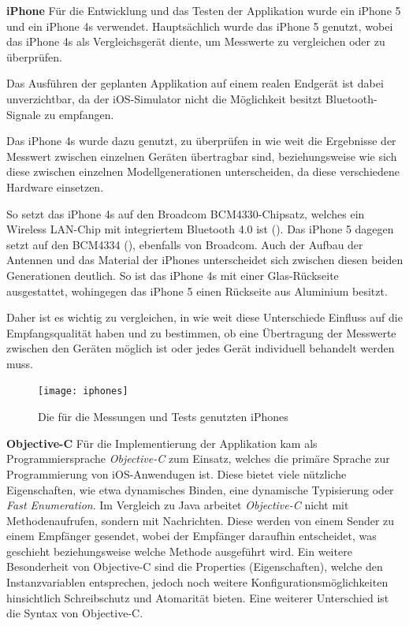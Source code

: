 \textbf{iPhone}
Für die Entwicklung und das Testen der Applikation wurde ein iPhone 5 und ein iPhone 4s verwendet. 
Hauptsächlich wurde das iPhone 5 genutzt, wobei das iPhone 4s als Vergleichsgerät diente, um Messwerte zu vergleichen oder zu überprüfen.

Das Ausführen der geplanten Applikation auf einem realen Endgerät ist dabei unverzichtbar, da der iOS-Simulator nicht die Möglichkeit besitzt Bluetooth-Signale zu empfangen.

Das iPhone 4s wurde dazu genutzt, zu überprüfen in wie weit die Ergebnisse der Messwert zwischen einzelnen Geräten übertragbar sind, beziehungsweise wie sich diese zwischen einzelnen Modellgenerationen unterscheiden, da diese verschiedene Hardware einsetzen. 

So setzt das iPhone 4s auf den Broadcom BCM4330-Chipsatz, welches ein Wireless LAN-Chip mit integriertem Bluetooth 4.0 ist (\citet{iPhone4sTeardown}). Das iPhone 5 dagegen setzt auf den BCM4334 (\citet{iPhone5Teardown}), ebenfalls von Broadcom. 
Auch der Aufbau der Antennen und das Material der iPhones unterscheidet sich zwischen diesen beiden Generationen deutlich. 
So ist das iPhone 4s mit einer Glas-Rückseite ausgestattet, wohingegen das iPhone 5 einen Rückseite aus Aluminium besitzt.

Daher ist es wichtig zu vergleichen, in wie weit diese Unterschiede Einfluss auf die Empfangsqualität haben und zu bestimmen, ob eine Übertragung der Messwerte zwischen den Geräten möglich ist oder jedes Gerät individuell behandelt werden muss.

\begin{figure}[htb!]
		\centering
	\texttt{[image: iphones]}
	\caption{Die für die Messungen und Tests genutzten iPhones}
	\label{iphones}
\end{figure}

\textbf{Objective-C}
Für die Implementierung der Applikation kam als Programmiersprache \emph{Objective-C} zum Einsatz, welches die primäre Sprache zur Programmierung von iOS-Anwendugen ist. 
Diese bietet viele nützliche Eigenschaften, wie etwa dynamisches Binden, eine dynamische Typisierung oder \emph{Fast Enumeration}.
Im Vergleich zu Java arbeitet \emph{Objective-C} nicht mit Methodenaufrufen, sondern mit Nachrichten. Diese werden von einem Sender zu einem Empfänger gesendet, wobei der Empfänger daraufhin entscheidet, was geschieht beziehungsweise welche Methode ausgeführt wird. Ein weitere Besonderheit von Objective-C sind die Properties (Eigenschaften), welche den Instanzvariablen entsprechen, jedoch noch weitere Konfigurationsmöglichkeiten hinsichtlich Schreibschutz und Atomarität bieten.
Eine weiterer Unterschied ist die Syntax von Objective-C.

